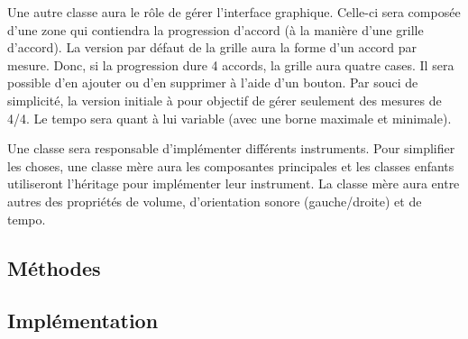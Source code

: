 \documentclass[letterpaper,12pt]{scrartcl}
\begin{document}
	Une autre classe aura le rôle de gérer l'interface graphique. Celle-ci sera composée d'une zone qui contiendra la progression d'accord (à la manière d'une grille d'accord). La version par défaut de la grille aura la forme d'un accord par mesure. Donc, si la progression dure 4 accords, la grille aura quatre cases. Il sera possible d'en ajouter ou d'en supprimer à l'aide d'un bouton. Par souci de simplicité, la version initiale à pour objectif de gérer seulement des mesures de 4/4. Le tempo sera quant à lui variable (avec une borne maximale et minimale).
	
	Une classe sera responsable d'implémenter différents instruments. Pour simplifier les choses, une classe mère aura les composantes principales et les classes enfants utiliseront l'héritage pour implémenter leur instrument. La classe mère aura entre autres des propriétés de volume, d'orientation sonore (gauche/droite) et de tempo. 
	\subsection{Méthodes}
	\subsection{Implémentation}
\end{document}
